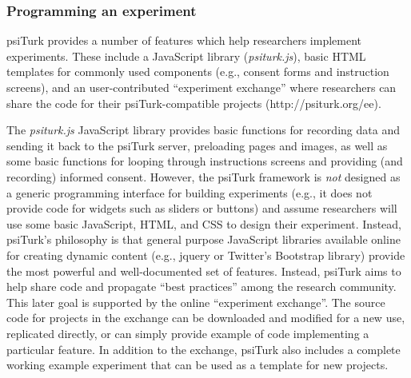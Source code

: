 \documentclass[twocolumn]{svjour3}          %
\newcommand{\psiturk}[0]{\textsf{psiTurk}}
\newcommand{\psiturkjs}[0]{\emph{psiturk.js}}
\begin{document}
\subsubsection{Programming an experiment}
\psiturk{} provides a number of features which help researchers implement 
experiments.  These include a JavaScript library (\psiturkjs{}), basic HTML templates 
for commonly used components (e.g., consent forms and instruction screens), 
and an user-contributed ``experiment exchange'' where researchers can share the code for their \psiturk{}-compatible
projects (\textsf{http://psiturk.org/ee}). 

The \psiturkjs{} JavaScript library provides basic functions for recording data and sending it back to the \psiturk{} server,
preloading pages and images, as well as some basic functions for looping through instructions
screens and providing (and recording) informed consent.
However, the \psiturk{} framework is \emph{not} designed as a generic
programming interface for building 
experiments (e.g., it does not provide code for widgets such as sliders or buttons) and assume
researchers will use some basic JavaScript, HTML, and CSS to design their experiment.  Instead, \psiturk{}'s
philosophy is that general purpose JavaScript libraries available online for creating dynamic content (e.g., jquery or
Twitter's Bootstrap library) provide the most powerful and well-documented set of features.  Instead, \psiturk{}
aims to help share code and propagate ``best practices'' among the research community.
This later goal is supported by the online ``experiment exchange''.
The source code for projects in the exchange can be downloaded and modified for a new use,
replicated directly, or can simply provide example of code implementing a particular 
feature.  In addition to the exchange, \psiturk{} also includes a complete working example 
experiment that can be used as a template for new projects.

\end{document}
